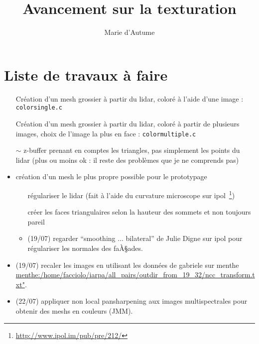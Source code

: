\documentclass{article}
\title{Avancement sur la texturation}
\author{Marie d'Autume}
\begin{document}
\maketitle

\section{Liste de travaux à faire}
\label{sec:todolist}

\begin{itemize}
\item[\checkmark] Création d'un mesh grossier à partir du lidar, coloré à l'aide d'une image : \verb"colorsingle.c"
\item[\checkmark] Création d'un mesh grossier à partir du lidar, coloré à partir de plusieurs images, choix de l'image la plus en face : \verb"colormultiple.c"
\item[$\sim$] z-buffer prenant en comptes les triangles, pas simplement les points du lidar (plus ou moins ok : il reste des probl\`emes que je ne comprends pas)
\item création d'un mesh le plus propre possible pour le prototypage
\begin{itemize}
\item[\checkmark] régulariser le lidar (fait à l'aide du curvature microscope
sur ipol~\footnote{\url{http://www.ipol.im/pub/pre/212/}})
\item[\checkmark]  créer les faces triangulaires selon la hauteur des sommets et
	non toujours pareil
\item (19/07) regarder ``smoothing ... bilateral'' de Julie Digne sur ipol pour
régulariser les normales des faÀ§ades.
\end{itemize}
\item (19/07) recaler les images en utilisant les données de gabriele sur menthe \url{menthe:/home/facciolo/iarpa/all_pairs/outdir_from_19_32/ncc_transform.txt"}. %
	\item (22/07) appliquer non local pansharpening aux images multispectrales pour obtenir des meshs en couleurs (JMM).


\end{itemize}
\end{document}
